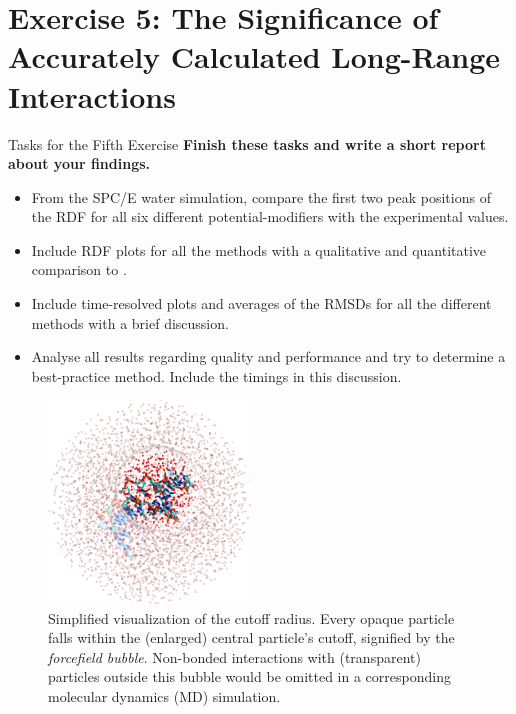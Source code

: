 \documentclass[9pt,tutorial]{livecoms}
\begin{document}
\section{Exercise 5: The Significance of Accurately Calculated Long-Range Interactions}\label{sec:longrangeIA}
\begin{Checklists}
    \begin{checklist}{Tasks for the Fifth Exercise}
    \textbf{Finish these tasks and write a short report about your findings.}
    \begin{itemize}
		\item From the SPC/E water simulation, compare the first two peak positions of the RDF for all six different potential-modifiers with the experimental values.
		\item Include RDF plots for all the methods with a qualitative and quantitative comparison to .
		\item Include time-resolved plots and averages of the RMSDs for all the different methods with a brief discussion.
		\item Analyse all results regarding quality and performance and try to determine a best-practice method. Include the timings in this discussion.
	\end{itemize} 
    \end{checklist}
\end{Checklists}
\begin{figure}[H]
    \centering
    \includegraphics[width=0.48\textwidth]{figures/VMD_rendered_cover_art.png}
    \caption{Simplified visualization of the cutoff radius. Every opaque particle falls within the (enlarged) central particle's cutoff, signified by the \textit{forcefield bubble}. Non-bonded interactions with (transparent) particles outside this bubble would be omitted in a corresponding molecular dynamics (MD) simulation.}
    \label{fig:VMD_rendered_cover_art}
\end{figure}
\end{document}
